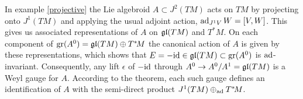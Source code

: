 \documentclass[leqno,12pt]{amsart} %
\begin{document}
\begin{example} In example \ref{projective} the Lie algebroid
  $A \subset J^2 (TM)$ acts on $TM$ by projecting onto $J^1 (TM)$ and applying the usual
  adjoint action, $\operatorname{ad}_{J^1 V}W = [V,W]$. This gives us associated representations of
  $A$ on $\mathfrak{gl}(TM)$ and $T^*\!M $. On each component of $\operatorname{\operatorname{gr}}(A^0)=\mathfrak{gl}(TM)\oplus T^*\!M$
  the canonical action of $A$ is given by these representations, which shows that
  $E = -\mathrm{id} \in \mathfrak{gl}(TM) \subset \operatorname{\operatorname{gr}}(A^0)$ is $\operatorname{ad}$-invariant. Consequently,
  any lift $\epsilon $ of $-\mathrm{id}$ through $A^0 \rightarrow A^0/A^1 = \mathfrak{gl}(TM)$ is a
  Weyl gauge for $A$. According to the theorem, each such gauge defines an identification
  of $A$ with the semi-direct product $J^1 (TM) \oplus_{\operatorname{ad}}T^*\!M $.
\end{example}
\end{document}
